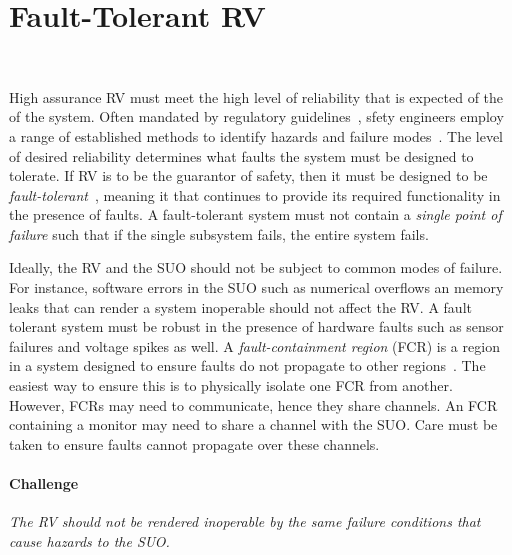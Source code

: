 \section{Fault-Tolerant RV}~\label{sec:ft}

 
High assurance  RV must meet the high level of reliability that is expected of
the of the system.  Often mandated by regulatory
guidelines~\cite{SAE4761}, sfety engineers employ a range of established
methods to identify hazards and failure modes~\cite{Levenson}. The level of desired
reliability determines what faults the system must be designed to
tolerate. If RV is to be the guarantor of safety, then it must be
designed to be \emph{fault-tolerant}~\cite{butler-faults}, meaning it
that continues to provide its required functionality in the presence
of faults.  A fault-tolerant system must not contain a \emph{single
  point of failure} such that if the single subsystem fails, the
entire system fails.


 Ideally, the RV and the SUO should not be subject to common
 modes of failure.  For instance, software errors in the SUO such as
 numerical overflows an memory leaks that can render a system
 inoperable should not affect the RV.  A fault tolerant system must
 be robust in the presence of hardware faults such as sensor failures
 and voltage spikes as well.  A \emph{fault-containment region} (FCR)
 is a region in a system designed to ensure faults do not propagate to
 other regions~\cite{Rushby01:buscompare}.   The 
 easiest way to ensure this is to physically isolate one FCR from
 another.  However, FCRs may need to communicate, hence they share
 channels. An FCR containing a monitor may need to share a channel
 with the SUO.  Care must be taken to ensure faults cannot propagate
 over these channels. 


\paragraph{Challenge}   \emph{The RV  should not be rendered inoperable by the
 same failure conditions that cause hazards to the SUO.}


